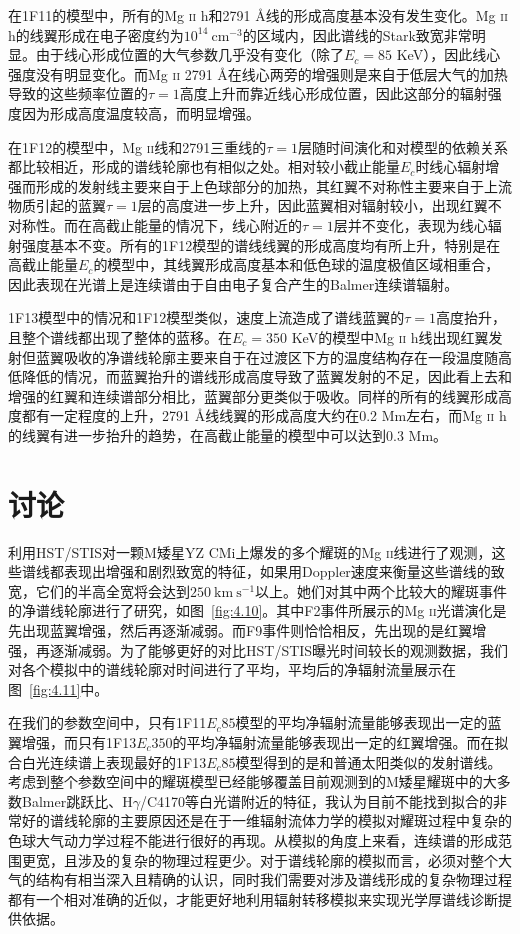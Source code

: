 在1F11的模型中，所有的Mg \textsc{ii} h和2791 \mbox{\AA}线的形成高度基本没有发生变化。Mg \textsc{ii} h的线翼形成在电子密度约为$10^{14}\ \mathrm{cm^{-3}}$的区域内，因此谱线的Stark致宽非常明显。由于线心形成位置的大气参数几乎没有变化（除了$E_c = 85$ KeV），因此线心强度没有明显变化。而Mg \textsc{ii} 2791 \mbox{\AA}在线心两旁的增强则是来自于低层大气的加热导致的这些频率位置的$\tau = 1$高度上升而靠近线心形成位置，因此这部分的辐射强度因为形成高度温度较高，而明显增强。

在1F12的模型中，Mg \textsc{ii}线和2791三重线的$\tau = 1$层随时间演化和对模型的依赖关系都比较相近，形成的谱线轮廓也有相似之处。相对较小截止能量$E_c$时线心辐射增强而形成的发射线主要来自于上色球部分的加热，其红翼不对称性主要来自于上流物质引起的蓝翼$\tau = 1$层的高度进一步上升，因此蓝翼相对辐射较小，出现红翼不对称性。而在高截止能量的情况下，线心附近的$\tau =1$层并不变化，表现为线心辐射强度基本不变。所有的1F12模型的谱线线翼的形成高度均有所上升，特别是在高截止能量$E_c$的模型中，其线翼形成高度基本和低色球的温度极值区域相重合，因此表现在光谱上是连续谱由于自由电子复合产生的Balmer连续谱辐射。

1F13模型中的情况和1F12模型类似，速度上流造成了谱线蓝翼的$\tau = 1$高度抬升，且整个谱线都出现了整体的蓝移。在$E_c = 350$ KeV的模型中Mg \textsc{ii} h线出现红翼发射但蓝翼吸收的净谱线轮廓主要来自于在过渡区下方的温度结构存在一段温度随高低降低的情况，而蓝翼抬升的谱线形成高度导致了蓝翼发射的不足，因此看上去和增强的红翼和连续谱部分相比，蓝翼部分更类似于吸收。同样的所有的线翼形成高度都有一定程度的上升，2791 \mbox{\AA}线线翼的形成高度大约在0.2 Mm左右，而Mg \textsc{ii} h的线翼有进一步抬升的趋势，在高截止能量的模型中可以达到0.3 Mm。



\section{讨论}
\textcites{Hawley2007}利用HST/STIS对一颗M矮星YZ CMi上爆发的多个耀斑的Mg \textsc{ii}线进行了观测，这些谱线都表现出增强和剧烈致宽的特征，如果用Doppler速度来衡量这些谱线的致宽，它们的半高全宽将会达到$250\ \mathrm{km\  s^{-1}}$以上。她们对其中两个比较大的耀斑事件的净谱线轮廓进行了研究，如图~\ref{fig:4.10}。其中F2事件所展示的Mg \textsc{ii}光谱演化是先出现蓝翼增强，然后再逐渐减弱。而F9事件则恰恰相反，先出现的是红翼增强，再逐渐减弱。为了能够更好的对比HST/STIS曝光时间较长的观测数据，我们对各个模拟中的谱线轮廓对时间进行了平均，平均后的净辐射流量展示在图~\ref{fig:4.11}中。

在我们的参数空间中，只有1F11$E_c85$模型的平均净辐射流量能够表现出一定的蓝翼增强，而只有1F13$E_c350$的平均净辐射流量能够表现出一定的红翼增强。而在拟合白光连续谱上表现最好的1F13$E_c85$模型得到的是和普通太阳类似的发射谱线。考虑到整个参数空间中的耀斑模型已经能够覆盖目前观测到的M矮星耀斑中的大多数Balmer跳跃比、H$\gamma$/C4170等白光谱附近的特征，我认为目前不能找到拟合的非常好的谱线轮廓的主要原因还是在于一维辐射流体力学的模拟对耀斑过程中复杂的色球大气动力学过程不能进行很好的再现。从模拟的角度上来看，连续谱的形成范围更宽，且涉及的复杂的物理过程更少。对于谱线轮廓的模拟而言，必须对整个大气的结构有相当深入且精确的认识，同时我们需要对涉及谱线形成的复杂物理过程都有一个相对准确的近似，才能更好地利用辐射转移模拟来实现光学厚谱线诊断提供依据。

